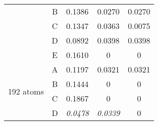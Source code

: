 \begin{table}[H]
\begin{tabular}{@{}ccccc@{}}
\multicolumn{1}{c|}{}                     & B          & 0.1386                                                                         & 0.0270                                                                         & 0.0270                                                                          \\
\multicolumn{1}{c|}{}                     & C          & 0.1347                                                                         & 0.0363                                                                         & 0.0075                                                                          \\
\multicolumn{1}{c|}{}                     & D          & 0.0892                                                                         & 0.0398                                                                         & 0.0398                                                                          \\
\multicolumn{1}{c|}{}                     & E          & 0.1610                                                                         & 0                                                                              & 0                                                                               \\ \midrule
\multicolumn{1}{c|}{\multirow{5}{*}{192 atoms}} & A          & 0.1197                                                                         & 0.0321                                                                         & 0.0321                                                                          \\
\multicolumn{1}{c|}{}                     & B          & 0.1444                                                                         & 0                                                                              & 0                                                                               \\
\multicolumn{1}{c|}{}                     & C          & 0.1867                                                                         & 0                                                                              & 0                                                                               \\
\multicolumn{1}{c|}{}                     & D          & \textit{0.0478}                                                                & \textit{0.0339}                                                                         & 0                                                                               \\

\end{tabular}
\end{table}
